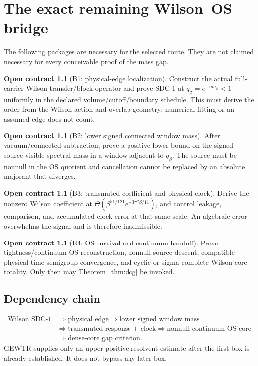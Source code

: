 \documentclass[11pt,oneside]{report}
\theoremstyle{definition}
\newtheorem{contract}[theorem]{Open contract}
\theoremstyle{remark}
\begin{document}
\chapter{The exact remaining Wilson--OS bridge}

The following packages are necessary for the selected route. They are not
claimed necessary for every conceivable proof of the mass gap.

\begin{contract}[B1: physical-edge localization]
Construct the actual full-carrier Wilson transfer/block operator and prove
SDC-1 at
$q_\beta=e^{-ma_\beta}<1$ uniformly in the declared volume/cutoff/boundary
schedule. This must derive the order from the Wilson action and overlap
geometry; numerical fitting or an assumed edge does not count.
\end{contract}

\begin{contract}[B2: lower signed connected window mass]
After vacuum/connected subtraction, prove a positive lower bound on the signed
source-visible spectral mass in a window adjacent to $q_\beta$. The source
must be nonnull in the OS quotient and cancellation cannot be replaced by an
absolute majorant that diverges.
\end{contract}

\begin{contract}[B3: transmuted coefficient and physical clock]
Derive the nonzero Wilson coefficient at
$\Theta(\beta^{51/121}e^{-3\pi^2\beta/11})$, and control leakage, comparison,
and accumulated clock error at that same scale. An algebraic error overwhelms
the signal and is therefore inadmissible.
\end{contract}

\begin{contract}[B4: OS survival and continuum handoff]
Prove tightness/continuum OS reconstruction, nonnull source descent, compatible
physical-time semigroup convergence, and cyclic or sigma-complete Wilson core
totality. Only then may Theorem~\ref{thm:dcg} be invoked.
\end{contract}

\section{Dependency chain}
\[
\begin{aligned}
 \boxed{\text{Wilson SDC-1}}&\Longrightarrow\boxed{\text{physical edge}}
 \Longrightarrow\boxed{\text{lower signed window mass}}\\
 &\Longrightarrow\boxed{\text{transmuted response + clock}}
 \Longrightarrow\boxed{\text{nonnull continuum OS core}}\\
 &\Longrightarrow\boxed{\text{dense-core gap criterion}}.
\end{aligned}
\]
GEWTR supplies only an upper positive resolvent estimate after the first box is
already established. It does not bypass any later box.
\end{document}
